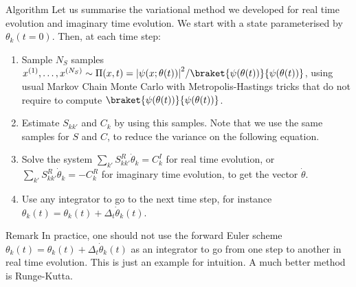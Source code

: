 \documentclass[a4paper]{article}
\begin{document}
\begin{parag}{Algorithm}
    Let us summarise the variational method we developed for real time evolution and imaginary time evolution. We start with a state parameterised by $\theta_k\left(t = 0\right)$. Then, at each time step:
    \begin{enumerate}
        \item Sample $N_S$ samples $x^{\left(1\right)}, \ldots, x^{\left(N_S\right)} \followsdistr \Pi\left(x, t\right) = \left|\psi\left(x; \theta\left(t\right)\right)\right|^2/\braket{\psi\left(\theta\left(t\right)\right)}{\psi\left(\theta\left(t\right)\right)}$, using usual Markov Chain Monte Carlo with Metropolis-Hastings tricks that do not require to compute $\braket{\psi\left(\theta\left(t\right)\right)}{\psi\left(\theta\left(t\right)\right)}$.
        \item Estimate $S_{k k'}$ and $C_k$ by using this samples. Note that we use the same samples for $S$ and $C$, to reduce the variance on the following equation.
        \item Solve the system $\sum_{k'} S_{k k'}^R \dot{\theta}_k = C_k^I$ for real time evolution, or $\sum_{k'} S_{k k'}^R \dot{\theta}_k = -C_k^R$ for imaginary time evolution, to get the vector $\dot{\theta}$.
        \item Use any integrator to go to the next time step, for instance $\theta_k\left(t\right) = \theta_k\left(t\right) + \Delta_t \dot{\theta}_k\left(t\right)$.
    \end{enumerate}

    \begin{subparag}{Remark}
        In practice, one should not use the forward Euler scheme $\theta_k\left(t\right) = \theta_k\left(t\right) + \Delta_t \dot{\theta}_k\left(t\right)$ as an integrator to go from one step to another in real time evolution. This is just an example for intuition. A much better method is Runge-Kutta.
    \end{subparag}
\end{parag}
 
\end{document}
